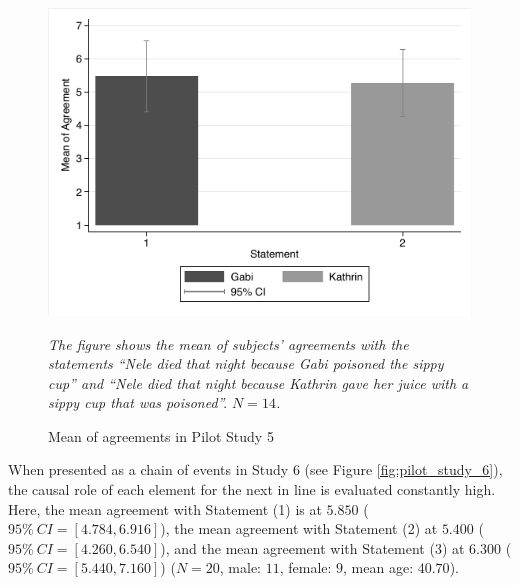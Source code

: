 \documentclass[egregdoesnotlikesansseriftitles,12pt]{scrartcl}
\begin{document}
\begin{figure}[H]
   \centering
   \includegraphics[scale=0.8]{figures/pilot_study_5.pdf}
   \begin{minipage}{0.9\linewidth}
   \footnotesize
   \emph{The figure shows the mean of subjects' agreements with the statements ``Nele died that night because Gabi poisoned the sippy cup'' and ``Nele died that night because Kathrin gave her juice with a sippy cup that was poisoned''. $N=14$.}
   \end{minipage}
   \caption{Mean of agreements in Pilot Study 5}
   \label{fig:pilot_study_5}
\end{figure}

\noindent When presented as a chain of events in Study 6 (see Figure \ref{fig:pilot_study_6}), the causal role of each element for the next in line is evaluated constantly high. Here, the mean agreement with Statement (1) is at $5.850$ ($95\%~CI=[4.784,6.916]$), the mean agreement with Statement (2) at $5.400$ ($95\%~CI=[4.260,6.540]$), and the mean agreement with Statement (3) at $6.300$ ($95\%~CI=[5.440,7.160]$) ($N=20$, male: $11$, female: $9$, mean age: $40.70$).
\end{document}

